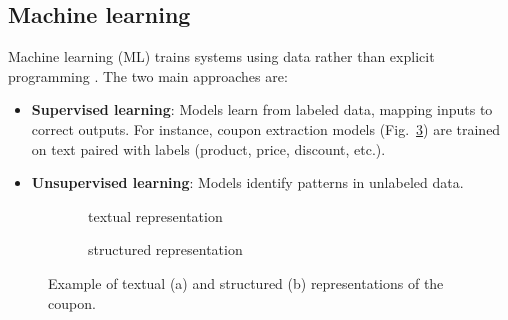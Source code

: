 \documentclass[licencjacka,en]{pracamgr}
\begin{document}
\subsection{Machine learning}
Machine learning (ML) trains systems using data rather than explicit programming \cite{francuz}. The two main approaches are:

\begin{itemize}
    \item \textbf{Supervised learning}: Models learn from labeled data, mapping inputs to correct outputs. For instance, coupon extraction models (Fig.~\ref{list:input}) are trained on text paired with labels (product, price, discount, etc.).

    \item \textbf{Unsupervised learning}: Models identify patterns in unlabeled data.
\end{itemize}

\begin{figure}[ht]
    \centering
    \begin{subfigure}{0.9\textwidth}
        \caption{textual representation}
        \label{list:tr}
    \end{subfigure}

    \vspace{5mm}

    \begin{subfigure}{0.9\textwidth}
        \caption{structured representation}
        \label{list:sr}
    \end{subfigure}

    \caption{Example of textual (a) and structured (b) representations of the coupon.}
    \label{list:input}
\end{figure}
\end{document}
